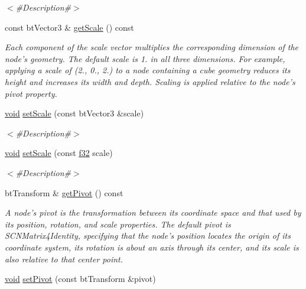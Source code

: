 \begin{DoxyCompactItemize}
\begin{DoxyCompactList}\small\item\em $<$\#\+Description\#$>$ \end{DoxyCompactList}\item 
const bt\+Vector3 \& \mbox{\hyperlink{classnjli_1_1_node_a623cb5452d643d156fdaa2a7a0c2ce43}{get\+Scale}} () const
\begin{DoxyCompactList}\small\item\em Each component of the scale vector multiplies the corresponding dimension of the node’s geometry. The default scale is 1. in all three dimensions. For example, applying a scale of (2., 0., 2.) to a node containing a cube geometry reduces its height and increases its width and depth. Scaling is applied relative to the node’s pivot property. \end{DoxyCompactList}\item 
\mbox{\hyperlink{_thread_8h_af1e856da2e658414cb2456cb6f7ebc66}{void}} \mbox{\hyperlink{classnjli_1_1_node_a765aaabc294a7c30171b86d22fe31a43}{set\+Scale}} (const bt\+Vector3 \&scale)
\begin{DoxyCompactList}\small\item\em $<$\#\+Description\#$>$ \end{DoxyCompactList}\item 
\mbox{\hyperlink{_thread_8h_af1e856da2e658414cb2456cb6f7ebc66}{void}} \mbox{\hyperlink{classnjli_1_1_node_a82b119a67be08f51cb55e2488abc8eb9}{set\+Scale}} (const \mbox{\hyperlink{_util_8h_a5f6906312a689f27d70e9d086649d3fd}{f32}} scale)
\begin{DoxyCompactList}\small\item\em $<$\#\+Description\#$>$ \end{DoxyCompactList}\item 
bt\+Transform \& \mbox{\hyperlink{classnjli_1_1_node_aa3d0fa27774066836af2b64346641779}{get\+Pivot}} () const
\begin{DoxyCompactList}\small\item\em A node’s pivot is the transformation between its coordinate space and that used by its position, rotation, and scale properties. The default pivot is S\+C\+N\+Matrix4\+Identity, specifying that the node’s position locates the origin of its coordinate system, its rotation is about an axis through its center, and its scale is also relative to that center point. \end{DoxyCompactList}\item 
\mbox{\hyperlink{_thread_8h_af1e856da2e658414cb2456cb6f7ebc66}{void}} \mbox{\hyperlink{classnjli_1_1_node_a84a2fde3b93ec048a3ccfa7a993307cf}{set\+Pivot}} (const bt\+Transform \&pivot)

\end{DoxyCompactItemize}
